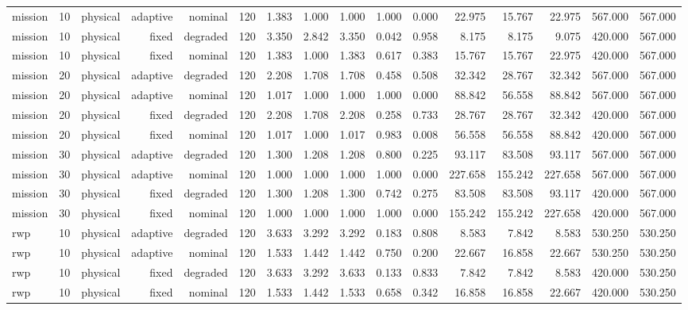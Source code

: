 \begin{tabular}{lrrrrrrrrrrrrrrr}
mission & 10 & physical & adaptive & nominal & 120 & 1.383 & 1.000 & 1.000 & 1.000 & 0.000 & 22.975 & 15.767 & 22.975 & 567.000 & 567.000 \\
mission & 10 & physical & fixed & degraded & 120 & 3.350 & 2.842 & 3.350 & 0.042 & 0.958 & 8.175 & 8.175 & 9.075 & 420.000 & 567.000 \\
mission & 10 & physical & fixed & nominal & 120 & 1.383 & 1.000 & 1.383 & 0.617 & 0.383 & 15.767 & 15.767 & 22.975 & 420.000 & 567.000 \\
mission & 20 & physical & adaptive & degraded & 120 & 2.208 & 1.708 & 1.708 & 0.458 & 0.508 & 32.342 & 28.767 & 32.342 & 567.000 & 567.000 \\
mission & 20 & physical & adaptive & nominal & 120 & 1.017 & 1.000 & 1.000 & 1.000 & 0.000 & 88.842 & 56.558 & 88.842 & 567.000 & 567.000 \\
mission & 20 & physical & fixed & degraded & 120 & 2.208 & 1.708 & 2.208 & 0.258 & 0.733 & 28.767 & 28.767 & 32.342 & 420.000 & 567.000 \\
mission & 20 & physical & fixed & nominal & 120 & 1.017 & 1.000 & 1.017 & 0.983 & 0.008 & 56.558 & 56.558 & 88.842 & 420.000 & 567.000 \\
mission & 30 & physical & adaptive & degraded & 120 & 1.300 & 1.208 & 1.208 & 0.800 & 0.225 & 93.117 & 83.508 & 93.117 & 567.000 & 567.000 \\
mission & 30 & physical & adaptive & nominal & 120 & 1.000 & 1.000 & 1.000 & 1.000 & 0.000 & 227.658 & 155.242 & 227.658 & 567.000 & 567.000 \\
mission & 30 & physical & fixed & degraded & 120 & 1.300 & 1.208 & 1.300 & 0.742 & 0.275 & 83.508 & 83.508 & 93.117 & 420.000 & 567.000 \\
mission & 30 & physical & fixed & nominal & 120 & 1.000 & 1.000 & 1.000 & 1.000 & 0.000 & 155.242 & 155.242 & 227.658 & 420.000 & 567.000 \\
rwp & 10 & physical & adaptive & degraded & 120 & 3.633 & 3.292 & 3.292 & 0.183 & 0.808 & 8.583 & 7.842 & 8.583 & 530.250 & 530.250 \\
rwp & 10 & physical & adaptive & nominal & 120 & 1.533 & 1.442 & 1.442 & 0.750 & 0.200 & 22.667 & 16.858 & 22.667 & 530.250 & 530.250 \\
rwp & 10 & physical & fixed & degraded & 120 & 3.633 & 3.292 & 3.633 & 0.133 & 0.833 & 7.842 & 7.842 & 8.583 & 420.000 & 530.250 \\
rwp & 10 & physical & fixed & nominal & 120 & 1.533 & 1.442 & 1.533 & 0.658 & 0.342 & 16.858 & 16.858 & 22.667 & 420.000 & 530.250 \\

\end{tabular}
